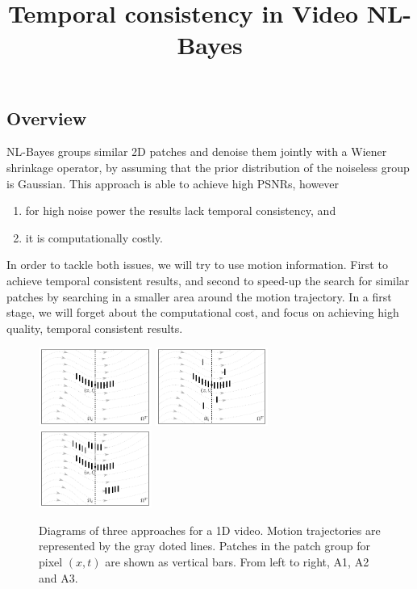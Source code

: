 \documentclass[a4paper,10pt]{article}
\title{Temporal consistency in Video NL-Bayes}
\author{}
\date{}
\begin{document}
\maketitle
{}

\subsection*{Overview}

NL-Bayes groups similar 2D patches and denoise them jointly with a
Wiener shrinkage operator, by assuming that the prior distribution of
the noiseless group is Gaussian. This approach is able to achieve
high PSNRs, however
\begin{enumerate}
	\item for high noise power the results lack temporal consistency,
		and
	\item it is computationally costly.
\end{enumerate}

In order to tackle both issues, we will try to use motion
information. First to achieve temporal consistent results, and
second to speed-up the search for similar patches by searching
in a smaller area around the motion trajectory.
%
In a first stage, we will forget about the computational cost, and
focus on achieving high quality, temporal consistent results.

\bigskip

\bigskip

\begin{figure}[htpb!]
	\centering
	\includegraphics[width=0.33\textwidth]{figs/approach1}%
	\includegraphics[width=0.33\textwidth]{figs/approach2}%
	\includegraphics[width=0.33\textwidth]{figs/approach3}
	\caption{Diagrams of three approaches for a 1D video. Motion
	trajectories are represented by the gray doted lines. Patches
	in the patch group for pixel $(x,t)$ are shown as vertical bars.
   From left to right, A1, A2 and A3.}
	\label{fig:3_approaches}
\end{figure}
\end{document}
